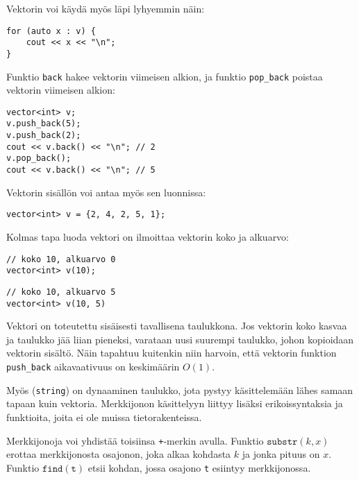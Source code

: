 \begin{samepage}
Vektorin voi käydä myös läpi lyhyemmin näin:

\begin{lstlisting}
for (auto x : v) {
    cout << x << "\n";
}
\end{lstlisting}
\end{samepage}

Funktio \texttt{back} hakee vektorin viimeisen alkion,
ja funktio \texttt{pop\_back} poistaa vektorin
viimeisen alkion:

\begin{lstlisting}
vector<int> v;
v.push_back(5);
v.push_back(2);
cout << v.back() << "\n"; // 2
v.pop_back();
cout << v.back() << "\n"; // 5
\end{lstlisting}

Vektorin sisällön voi antaa myös sen luonnissa:

\begin{lstlisting}
vector<int> v = {2, 4, 2, 5, 1};
\end{lstlisting}

Kolmas tapa luoda vektori on ilmoittaa
vektorin koko ja alkuarvo:

\begin{lstlisting}
// koko 10, alkuarvo 0
vector<int> v(10);
\end{lstlisting}
\begin{lstlisting}
// koko 10, alkuarvo 5
vector<int> v(10, 5)
\end{lstlisting}

Vektori on toteutettu sisäisesti tavallisena taulukkona.
Jos vektorin koko kasvaa ja taulukko jää liian pieneksi,
varataan uusi suurempi taulukko, johon kopioidaan
vektorin sisältö.
Näin tapahtuu kuitenkin niin harvoin, että vektorin
funktion \texttt{push\_back} aikavaativuus on
keskimäärin $O(1)$.


Myös  (\texttt{string}) on dynaaminen taulukko,
jota pystyy käsittelemään lähes samaan
tapaan kuin vektoria.
Merkkijonon käsittelyyn liittyy lisäksi erikoissyntaksia
ja funktioita, joita ei ole muissa tietorakenteissa.

Merkkijonoja voi yhdistää toisiinsa \texttt{+}-merkin avulla.
Funktio $\texttt{substr}(k,x)$ erottaa merkkijonosta
osajonon, joka alkaa kohdasta $k$ ja jonka pituus on $x$.
Funktio $\texttt{find}(\texttt{t})$ etsii kohdan,
jossa osajono \texttt{t} esiintyy merkkijonossa.

